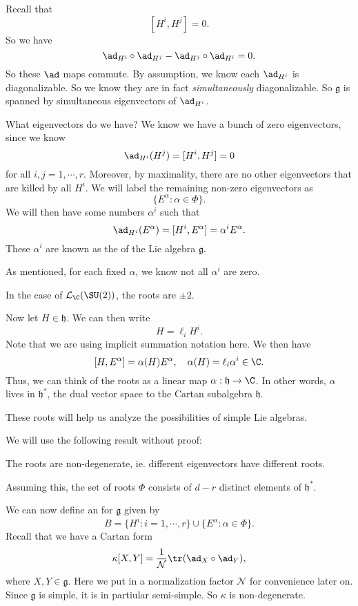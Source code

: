 \documentclass[a4paper]{article}
\begin{document}
Recall that
\[
  [H^i, H^j]= 0.
\]
So we have
\[
  \ad_{H^i} \circ \ad_{H^j} - \ad_{H^j} \circ \ad_{H^i} = 0.
\]
So these $\ad$ maps commute. By assumption, we know each $\ad_{H^i}$ is diagonalizable. So we know they are in fact \emph{simultaneously} diagonalizable. So $\mathfrak{g}$ is spanned by simultaneous eigenvectors of $\ad_{H^i}$.

What eigenvectors do we have? We know we have a bunch of zero eigenvectors, since we know
\[
  \ad_{H^i}(H^j) = [H^i, H^j] = 0
\]
for all $i, j = 1, \cdots, r$. Moreover, by maximality, there are no other eigenvectors that are killed by all $H^i$. We will label the remaining non-zero eigenvectors as
\[
  \{E^\alpha: \alpha \in \Phi\}.
\]
We will then have some numbers $\alpha^i$ such that
\[
  \ad_{H^i}(E^\alpha) = [H^i, E^\alpha] = \alpha^i E^\alpha.
\]
These $\alpha^i$ are known as the  of the Lie algebra $\mathfrak{g}$.

As mentioned, for each fixed $\alpha$, we know not all $\alpha^i$ are zero.

\begin{eg}
  In the case of $\mathcal{L}_\C(\SU(2))$, the roots are $\pm 2$.
\end{eg}

Now let $H \in \mathfrak{h}$. We can then write
\[
  H = \ell_i H^i.
\]
Note that we are using implicit summation notation here. We then have
\[
  [H, E^\alpha] = \alpha(H) E^\alpha,\quad \alpha(H) = \ell_i \alpha^i \in \C.
\]
Thus, we can think of the roots as a linear map $\alpha: \mathfrak{h} \to \C$. In other words, $\alpha$ lives in $\mathfrak{h}^*$, the dual vector space to the Cartan subalgebra $\mathfrak{h}$.

These roots will help us analyze the possibilities of simple Lie algebras.

We will use the following result without proof:
\begin{fact}
  The roots are non-degenerate, ie. different eigenvectors have different roots.
\end{fact}
Assuming this, the set of roots $\Phi$ consists of $d - r$ distinct elements of $\mathfrak{h}^*$.

We can now define an  for $\mathfrak{g}$ given by
\[
  B = \{H^i: i = 1, \cdots, r\} \cup \{E^\alpha: \alpha \in \Phi\}.
\]
Recall that we have a Cartan form
\[
 \kappa[X, Y] = \frac{1}{\mathcal{N}} \tr(\ad_X \circ \ad_Y),
\]
where $X, Y \in \mathfrak{g}$. Here we put in a normalization factor $\mathcal{N}$ for convenience later on. Since $\mathfrak{g}$ is simple, it is in partiular semi-simple. So $\kappa$ is non-degenerate.
\end{document}
